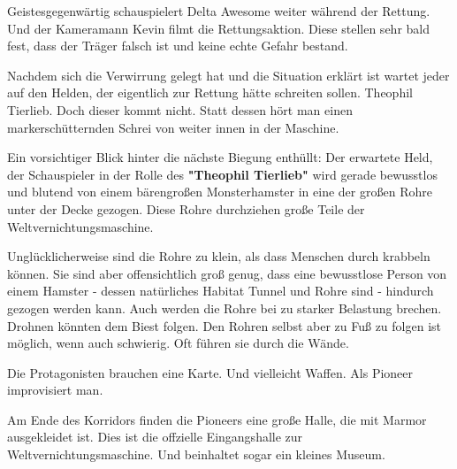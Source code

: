 Geistesgegenwärtig schauspielert Delta Awesome weiter während der Rettung. Und der Kameramann Kevin filmt die Rettungsaktion. Diese stellen sehr bald fest, dass der Träger falsch ist und keine echte Gefahr bestand.

Nachdem sich die Verwirrung gelegt hat und die Situation erklärt ist wartet jeder auf den Helden, der eigentlich zur Rettung hätte schreiten sollen. Theophil Tierlieb. Doch dieser kommt nicht. Statt dessen hört man einen markerschütternden Schrei von weiter innen in der Maschine.

Ein vorsichtiger Blick hinter die nächste Biegung enthüllt: Der erwartete Held, der Schauspieler in der Rolle des \textbf{"Theophil Tierlieb"} wird gerade bewusstlos und blutend von einem bärengroßen Monsterhamster in eine der großen Rohre unter der Decke gezogen. Diese Rohre durchziehen große Teile der Weltvernichtungsmaschine.

Unglücklicherweise sind die Rohre zu klein, als dass Menschen durch krabbeln können. Sie sind aber offensichtlich groß genug, dass eine bewusstlose Person von einem Hamster - dessen natürliches Habitat Tunnel und Rohre sind - hindurch gezogen werden kann. Auch werden die Rohre bei zu starker Belastung brechen. Drohnen könnten dem Biest folgen. Den Rohren selbst aber zu Fuß zu folgen ist möglich, wenn auch schwierig. Oft führen sie durch die Wände.

Die Protagonisten brauchen eine Karte. Und vielleicht Waffen. Als Pioneer improvisiert man.

Am Ende des Korridors finden die Pioneers eine große Halle, die mit Marmor ausgekleidet ist. Dies ist die offzielle Eingangshalle zur Weltvernichtungsmaschine. Und beinhaltet sogar ein kleines Museum.

